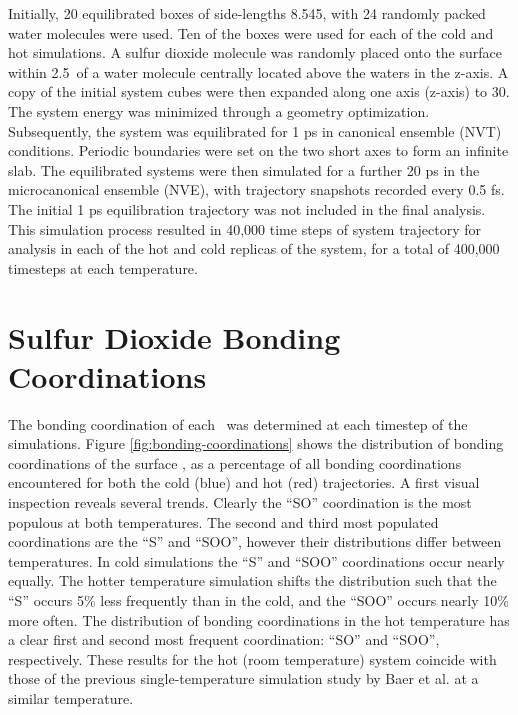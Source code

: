 \documentclass{article}
\begin{document}
Initially, 20 equilibrated boxes of side-lengths 8.545\angs, with 24 randomly packed water molecules were used. Ten of the boxes were used for each of the cold and hot simulations. A sulfur dioxide molecule was randomly placed onto the surface within 2.5\angs~of a water molecule centrally located above the waters in the z-axis. A copy of the initial system cubes were then expanded along one axis (z-axis) to 30\angs. The system energy was minimized through a geometry optimization. Subsequently, the system was equilibrated for 1 ps in canonical ensemble (NVT) conditions. Periodic boundaries were set on the two short axes to form an infinite slab. The equilibrated systems were then simulated for a further 20 ps in the microcanonical ensemble (NVE), with trajectory snapshots recorded every 0.5 fs. The initial 1 ps equilibration trajectory was not included in the final analysis. This simulation process resulted in 40,000 time steps of system trajectory for analysis in each of the hot and cold replicas of the system, for a total of 400,000 timesteps at each temperature.

\section {Sulfur Dioxide Bonding Coordinations}

The bonding coordination of each \suldiox~was determined at each timestep of the simulations. Figure \ref{fig:bonding-coordinations} shows the distribution of bonding coordinations of the surface \suldiox, as a percentage of all bonding coordinations encountered for both the cold (blue) and hot (red) trajectories. A first visual inspection reveals several trends. Clearly the ``SO'' coordination is the most populous at both temperatures. The second and third most populated coordinations are the ``S'' and ``SOO'', however their distributions differ between temperatures. In cold simulations the ``S'' and ``SOO'' coordinations occur nearly equally. The hotter temperature simulation shifts the distribution such that the ``S'' occurs 5\% less frequently than in the cold, and the ``SOO'' occurs nearly 10\% more often. The distribution of bonding coordinations in the hot temperature has a clear first and second most frequent coordination: ``SO'' and ``SOO'', respectively. These results for the hot (room temperature) system coincide with those of the previous single-temperature simulation study by Baer et al. at a similar temperature.\cite{Baer2010}
\end{document}
